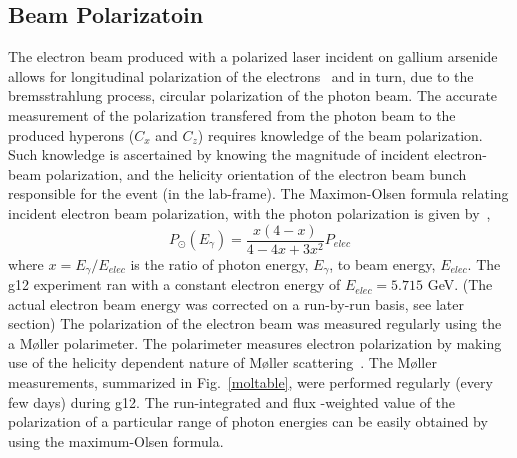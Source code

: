 \subsection{\label{sec:calib.pol}Beam Polarizatoin}
The electron beam produced with a polarized laser incident on gallium arsenide allows for longitudinal polarization of the electrons~\cite{polarizedelectrons} and in turn, due to the bremsstrahlung process, circular polarization of the photon beam.  The accurate measurement of the polarization transfered from the photon beam to the produced hyperons ($C_x$ and $C_z$) requires knowledge of the beam polarization.  Such knowledge is ascertained by knowing the magnitude of incident electron-beam polarization, and the helicity orientation of the electron beam bunch responsible for the event (in the lab-frame). The Maximon-Olsen formula relating incident electron beam polarization, with the photon polarization is given by~\cite{MaximonOlsen},
\begin{equation}
P_\odot(E_\gamma) = \frac{x(4-x)}{4 - 4x + 3x^2}P_{elec}
\end{equation}
where $x = E_\gamma /E_{elec}$ is the ratio of photon energy, $E_\gamma$, to beam energy, $E_{elec}$. The g12 experiment ran with a constant electron energy of $E_{elec} = 5.715$ GeV.  (The actual electron beam energy was corrected on a run-by-run basis, see later section) The polarization of the electron beam was measured regularly using the a M{\o}ller polarimeter.  The polarimeter measures electron polarization by making use of the helicity dependent nature of M{\o}ller scattering~\cite{Mecking,Carman}. The M{\o}ller measurements, summarized in Fig.~\ref{moltable}, were performed regularly (every few days) during g12.  The run-integrated and flux -weighted value of the polarization of a particular range of photon energies can be easily obtained by using the maximum-Olsen formula.

